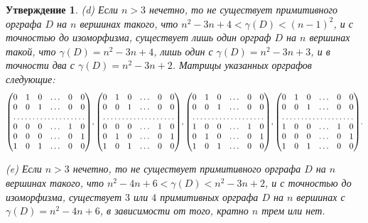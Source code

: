 \documentclass[11pt]{article}
\newtheorem{theorem}{Утверждение}
\begin{document}
\begin{theorem}
\emph{(d) \cite[Теорема~8]{DM64}} Если $n>3$ нечетно, то не существует примитивного
орграфа $D$ на $n$ вершинах такого, что $n^2-3n+4<\gamma(D)<(n-1)^2$,
и с точностью до изоморфизма, существует лишь один орграф $D$ на $n$ вершинах такой, что
$\gamma(D)=n^2-3n+4$, лишь один с $\gamma(D)=n^2-3n+3$, и в точности два с $\gamma(D)=n^2-3n+2$. 
Матрицы указанных орграфов следующие:
\begin{equation}
\label{odd island}
\begin{pmatrix}
0 & 1 & 0 & \dots & 0 & 0\\
0 & 0 & 1 & \dots & 0 & 0\\
\hdotsfor{6}\\
0 & 0 & 0 & \dots & 1 & 0\\
0 & 0 & 0 & \dots & 0 & 1\\
1 & 0 & 1 & \dots & 0 & 0
\end{pmatrix}\!,
\begin{pmatrix}
0 & 1 & 0 & \dots & 0 & 0\\
0 & 0 & 1 & \dots & 0 & 0\\
\hdotsfor{6}\\
0 & 0 & 0 & \dots & 1 & 0\\
0 & 1 & 0 & \dots & 0 & 1\\
1 & 0 & 1 & \dots & 0 & 0
\end{pmatrix}\!,
\begin{pmatrix}
0 & 1 & 0 & \dots & 0 & 0\\
0 & 0 & 1 & \dots & 0 & 0\\
\hdotsfor{6}\\
1 & 0 & 0 & \dots & 1 & 0\\
0 & 1 & 0 & \dots & 0 & 1\\
1 & 0 & 1 & \dots & 0 & 0
\end{pmatrix}\!,
\begin{pmatrix}
0 & 1 & 0 & \dots & 0 & 0\\
0 & 0 & 1 & \dots & 0 & 0\\
\hdotsfor{6}\\
1 & 0 & 0 & \dots & 1 & 0\\
0 & 0 & 0 & \dots & 0 & 1\\
1 & 0 & 1 & \dots & 0 & 0
\end{pmatrix}\!.
\end{equation}

\emph{(e) \cite[Теорема~8]{DM64}} Если $n>3$ нечетно, то не существует
примитивного орграфа $D$ на $n$ вершинах такого, что $n^2-4n+6<\gamma(D)<n^2-3n+2$,
и с точностью до изоморфизма, существует $3$ или $4$ примитивных орграфа $D$
на $n$ вершинах с $\gamma(D)=n^2-4n+6$, в зависимости от того, кратно $n$ трем или нет.
\end{theorem}
\end{document}
